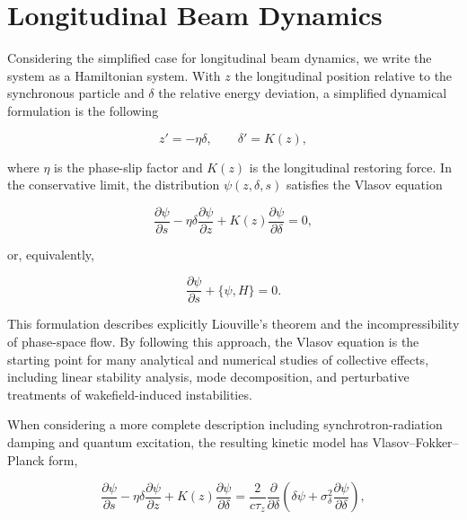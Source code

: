 \section{Longitudinal Beam Dynamics}
\label{sec:02_beam_dynamics_longitudinal_beam_dynamics}

Considering the simplified case for longitudinal beam dynamics, we write the system as a Hamiltonian system. With \(z\) the longitudinal position relative to the synchronous particle and \(\delta\) the relative energy deviation, a simplified dynamical formulation is the following

\begin{equation}
\label{eq:17}
z'=-\eta\delta,\qquad\delta'=K(z),
\end{equation}

where \(\eta\) is the phase-slip factor and \(K ( z )\) is the longitudinal restoring force. In the conservative limit, the distribution \(\psi ( z , \delta , s )\) satisfies the Vlasov equation

\begin{equation}
\label{eq:18}
\frac{\partial\psi}{\partial s}-\eta\delta\frac{\partial\psi}{\partial z}+K(z)\frac{\partial\psi}{\partial\delta}=0,
\end{equation}

or, equivalently,

\begin{equation}
\label{eq:19}
\frac{\partial\psi}{\partial s}+\{\psi,H\}=0.
\end{equation}

This formulation describes explicitly Liouville’s theorem and the incompressibility of phase-space flow. By following this approach, the Vlasov equation is the starting point for many analytical and numerical studies of collective effects, including linear stability analysis, mode decomposition, and perturbative treatments of wakefield-induced instabilities.

When considering a more complete description including synchrotron-radiation damping and quantum excitation, the resulting kinetic model has Vlasov–Fokker–Planck form,

\begin{equation}
\label{eq:20}
\frac{\partial\psi}{\partial s}-\eta\delta\frac{\partial\psi}{\partial z}+K(z)\frac{\partial\psi}{\partial\delta}=\frac{2}{c\tau_z}\frac{\partial}{\partial\delta}\left(\delta\psi+\sigma_{\delta}^2\frac{\partial\psi}{\partial\delta}\right),
\end{equation}

